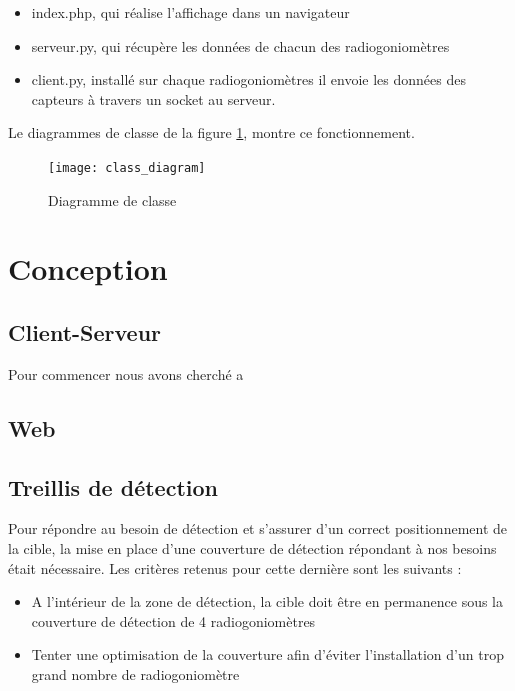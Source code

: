 \begin{itemize}
\item index.php, qui réalise l'affichage dans un navigateur
\item serveur.py, qui récupère les données de chacun des radiogoniomètres
\item client.py, installé sur chaque radiogoniomètres il envoie les données des capteurs à travers un socket au serveur.
\end{itemize}

Le diagrammes de classe de la figure \ref{fig:class}, montre ce fonctionnement.

\begin{figure}[!h]
  \centering
  \texttt{[image: class\_diagram]}
  \caption{Diagramme de classe}
  \label{fig:class}
\end{figure}



\section{Conception}

\subsection{Client-Serveur}

Pour commencer nous avons cherché a 

\subsection{Web}


\subsection{Treillis de détection}

Pour répondre au besoin de détection et s’assurer d’un correct positionnement de la cible, la mise en
place d’une couverture de détection répondant à nos besoins était nécessaire. Les critères retenus
pour cette dernière sont les suivants :

\begin{itemize}
\item A l’intérieur de la zone de détection, la cible doit être en permanence sous la couverture de détection de 4 radiogoniomètres
\item Tenter une optimisation de la couverture afin d’éviter l’installation d’un trop grand
nombre de radiogoniomètre
\end{itemize}

